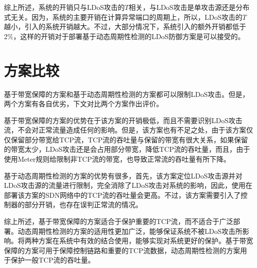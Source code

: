 综上所述，系统的开销只与LDoS攻击的$T$相关，与LDoS攻击是单攻击源还是分布式无关。因为，系统的主要开销在计算异常端口的周期上，所以，LDoS攻击的$T$越小，引入的系统开销越大。不过，大部分情况下，系统引入的额外开销都低于2\%，这样的开销对于部署基于动态周期性检测的LDoS防御方案是可以接受的。


\section{方案比较}
\label{chap05:compare}

基于带宽保障的方案和基于动态周期性检测的方案都可以限制LDoS攻击。但是，两个方案有各自优劣，下文对比两个方案作出评价。

基于带宽保障的方案的优势在于该方案的开销极低，而且不需要识别LDoS攻击流，不会对正常流量造成任何的影响。但是，该方案也有不足之处，由于该方案仅仅保留部分带宽给TCP流，TCP流的吞吐量与保留的带宽有很大关系，如果保留的带宽太少，LDoS攻击还是会占用部分带宽，降低TCP流的吞吐量，而且，由于使用Meter规则给限制非TCP流的带宽，也导致正常流的吞吐量有所下降。

基于动态周期性检测的方案的优势有很多，首先，该方案定位LDoS攻击源并对LDoS攻击源的流量进行限制，完全消除了LDoS攻击对系统的影响，因此，使用在部署该方案的SDN网络中的TCP流的吞吐量会更高。不过，该方案需要引入了控制器的部分开销，也存在误判正常流的情况。

综上所述，基于带宽保障的方案适合于保护重要的TCP流，而不适合于广泛部署。动态周期性检测的方案的适用性更加广泛，能够保证系统不被LDoS攻击所影响。将两种方案在系统中有效的结合使用，能够实现对系统更好的保护。基于带宽保障的方案可用于保障控制链路和重要的TCP流数据，动态周期性检测的方案用于保护一般TCP流的吞吐量。